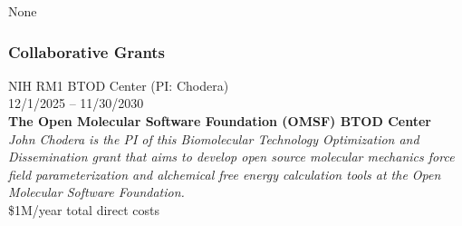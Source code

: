 \documentclass[10pt]{article}
\begin{document}




None

\subsubsection*{Collaborative Grants}

\vspace{1.5ex}

NIH RM1 BTOD Center (PI: Chodera)\\
12/1/2025 -- 11/30/2030\\
{\bf The Open Molecular Software Foundation (OMSF) BTOD Center}\\
\emph{John Chodera is the PI of this Biomolecular Technology Optimization and Dissemination grant that aims to develop open source molecular mechanics force field parameterization and alchemical free energy calculation tools at the Open Molecular Software Foundation.}\\
\$1M/year total direct costs



%
\end{document}
